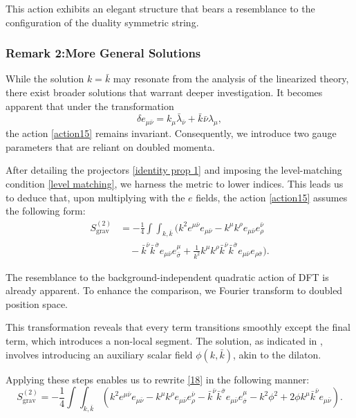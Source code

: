 \documentclass[13pt]{article}
\begin{document}
This action exhibits an elegant structure that bears a resemblance to the configuration of the duality symmetric string.

\subsubsection*{ Remark 2:More General Solutions}
While the solution $k = \bar{k}$ may resonate from the analysis of the linearized theory, there exist broader solutions that warrant deeper investigation. It becomes apparent that under the transformation
\begin{equation}
\delta e_{\mu \bar{\nu}} = k_{\mu}\bar{\lambda}_{\bar{\nu}} + \bar{k}_{}\bar{\nu}\lambda_{\mu}, \tag{20}
\end{equation}
the action \eqref{action15} remains invariant. Consequently, we introduce two gauge parameters that are reliant on doubled momenta.

After detailing the projectors \eqref{identity prop 1} and imposing the level-matching condition \eqref{level matching}, we harness the metric to lower indices. This leads us to deduce that, upon multiplying with the $e$ fields, the action \eqref{action15} assumes the following form:
\begin{align}
S_{\text{grav}}^{(2)} &= -\frac{1}{4} \int \int_{k, \bar{k}} (k^{2}e^{\mu \bar{\nu}}e_{\mu \bar{\nu}} - k^{\mu}k^{\rho}e_{\mu \bar{\nu}}e^{\bar{\nu}}_{\rho} \nonumber \\
&\quad - \bar{k}^{\bar{\nu}}\bar{k}^{\bar{\sigma}}e_{\mu \bar{\nu}}e^{\mu}_{\bar{\sigma}} + \frac{1}{k^2}k^{\mu}k^{\rho}\bar{k}^{\bar{\nu}}\bar{k}^{\bar{\sigma}}e_{\mu \bar{\nu}}e_{\rho \bar{\sigma}}). \tag{18}
\label{18}
\end{align}

The resemblance to the background-independent quadratic action of DFT is already apparent. To enhance the comparison, we Fourier transform to doubled position space.

 This transformation reveals that every term transitions smoothly except the final term, which introduces a non-local segment. The solution, as indicated in \cite{D_az_Jaramillo_2022}, involves introducing an auxiliary scalar field $\phi(k, \bar{k})$, akin to the dilaton.

Applying these steps enables us to rewrite \eqref{18} in the following manner:
\begin{equation}
S_{\text{grav}}^{(2)} = -\frac{1}{4} \int \int_{k, \bar{k}} (k^{2}e^{\mu \bar{\nu}}e_{\mu \bar{\nu}} - k^{\mu}k^{\rho}e_{\mu \bar{\nu}}e^{\bar{\nu}}_{\rho} - \bar{k}^{\bar{\nu}}\bar{k}^{\bar{\sigma}}e_{\mu \bar{\nu}}e^{\mu}_{\bar{\sigma}} - k^2 \phi^2 + 2\phi k^{\mu}\bar{k}^{\bar{\nu}}e_{\mu \bar{\nu}}). \tag{19}
\label{19}
\end{equation}
\end{document}
